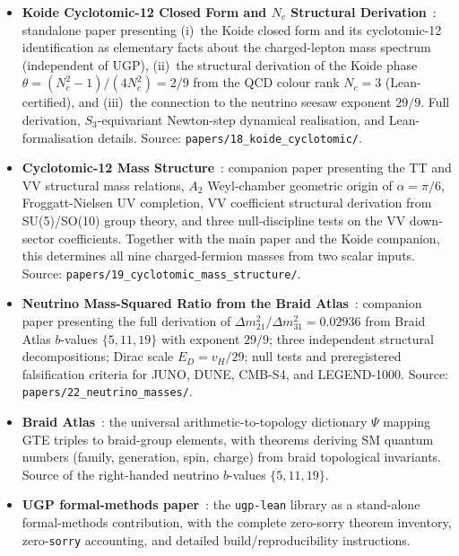\documentclass[10pt]{article}
\begin{document}
\begin{sloppypar}
\begin{itemize}
\item \textbf{Koide Cyclotomic-12 Closed Form and $N_c$ Structural Derivation}~\cite{Spivack2026_Koide}: standalone paper presenting (i)~the Koide closed form and its cyclotomic-12 identification as elementary facts about the charged-lepton mass spectrum (independent of UGP), (ii)~the structural derivation of the Koide phase $\theta = (N_c^2-1)/(4N_c^2) = 2/9$ from the QCD colour rank $N_c = 3$ (Lean-certified), and (iii)~the connection to the neutrino seesaw exponent $29/9$.  Full derivation, $S_3$-equivariant Newton-step dynamical realisation, and Lean-formalisation details.  Source: \nolinkurl{papers/18_koide_cyclotomic/}.

\item \textbf{Cyclotomic-12 Mass Structure}~\cite{Spivack2026_CyclotomicMass}: companion paper presenting the TT and VV structural mass relations, $A_2$ Weyl-chamber geometric origin of $\alpha=\pi/6$, Froggatt-Nielsen UV completion, VV coefficient structural derivation from SU(5)/SO(10) group theory, and three null-discipline tests on the VV down-sector coefficients.  Together with the main paper and the Koide companion, this determines all nine charged-fermion masses from two scalar inputs.  Source: \nolinkurl{papers/19_cyclotomic_mass_structure/}.

\item \textbf{Neutrino Mass-Squared Ratio from the Braid Atlas}~\cite{SpivackNeutrino}: companion paper presenting the full derivation of $\Delta m^2_{21}/\Delta m^2_{31} = 0.02936$ from Braid Atlas $b$-values $\{5,11,19\}$ with exponent $29/9$; three independent structural decompositions; Dirac scale $E_D = v_H/29$; null tests and preregistered falsification criteria for JUNO, DUNE, CMB-S4, and LEGEND-1000.  Source: \nolinkurl{papers/22_neutrino_masses/}.

\item \textbf{Braid Atlas}~\cite{SpivackBraidAtlas}: the universal arithmetic-to-topology dictionary $\Psi$ mapping GTE triples to braid-group elements, with theorems deriving SM quantum numbers (family, generation, spin, charge) from braid topological invariants.  Source of the right-handed neutrino $b$-values $\{5, 11, 19\}$.

\item \textbf{UGP formal-methods paper}~\cite{SpivackUGPFormalization}: the \texttt{ugp-lean} library as a stand-alone formal-methods contribution, with the complete zero-sorry theorem inventory, zero-\texttt{sorry} accounting, and detailed build/reproducibility instructions.

\end{itemize}
\end{sloppypar}
\end{document}
